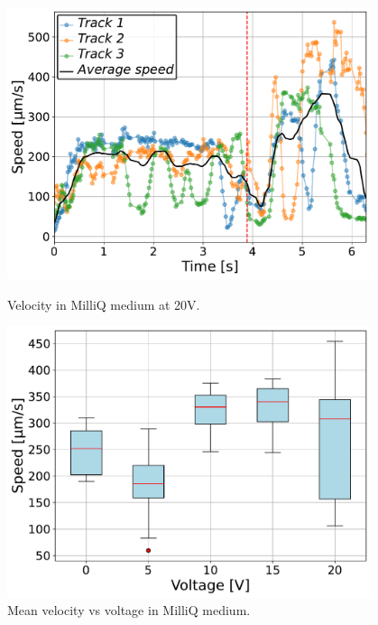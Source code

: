 \begin{figure}[H]
    \centering
    \begin{minipage}[t]{0.49\textwidth}
        \centering
        \includegraphics[width=0.95\textwidth]{Figures/MQ_20V_velocity_time.pdf}
        \caption{Velocity in MilliQ medium at 20V.}
        \label{fig:velocity_time_MQ_20V}
    \end{minipage}
    \hfill
    \begin{minipage}[t]{0.49\textwidth}
        \centering
        \includegraphics[width=0.95\textwidth]{Figures/MQ_velocity_vs_voltage.pdf}
        \caption{Mean velocity vs voltage in MilliQ medium.}
        \label{fig:velocity_vs_voltage_MQ}
    \end{minipage}
\end{figure}


